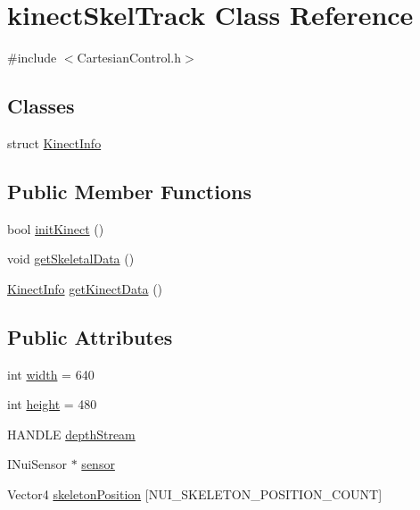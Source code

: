 \hypertarget{classkinectSkelTrack}{}\section{kinect\+Skel\+Track Class Reference}
\label{classkinectSkelTrack}


{\ttfamily \#include $<$Cartesian\+Control.\+h$>$}

\subsection*{Classes}
\begin{DoxyCompactItemize}
\item 
struct \hyperlink{structkinectSkelTrack_1_1KinectInfo}{Kinect\+Info}
\end{DoxyCompactItemize}
\subsection*{Public Member Functions}
\begin{DoxyCompactItemize}
\item 
bool \hyperlink{classkinectSkelTrack_a2960fe70db543c6f59052c69c0fc6392}{init\+Kinect} ()
\item 
void \hyperlink{classkinectSkelTrack_a5508892e28cbd0acc638cca252627365}{get\+Skeletal\+Data} ()
\item 
\hyperlink{structkinectSkelTrack_1_1KinectInfo}{Kinect\+Info} \hyperlink{classkinectSkelTrack_aae6367b3180ed7831aa417dbb82ae2f3}{get\+Kinect\+Data} ()
\end{DoxyCompactItemize}
\subsection*{Public Attributes}
\begin{DoxyCompactItemize}
\item 
int \hyperlink{classkinectSkelTrack_a8f20f39c8822eecba07518a8b35a9f2b}{width} = 640
\item 
int \hyperlink{classkinectSkelTrack_a028f14282cd4301c8527703300d3dfe8}{height} = 480
\item 
H\+A\+N\+D\+LE \hyperlink{classkinectSkelTrack_ac736221c582bd751c18af867bd1b90f1}{depth\+Stream}
\item 
I\+Nui\+Sensor $\ast$ \hyperlink{classkinectSkelTrack_a56f6ca7277b34103919fb8a467f72820}{sensor}
\item 
Vector4 \hyperlink{classkinectSkelTrack_aaebb56f3ac894f41fe5c88334bfda4ed}{skeleton\+Position} \mbox{[}N\+U\+I\+\_\+\+S\+K\+E\+L\+E\+T\+O\+N\+\_\+\+P\+O\+S\+I\+T\+I\+O\+N\+\_\+\+C\+O\+U\+NT\mbox{]}
\end{DoxyCompactItemize}


